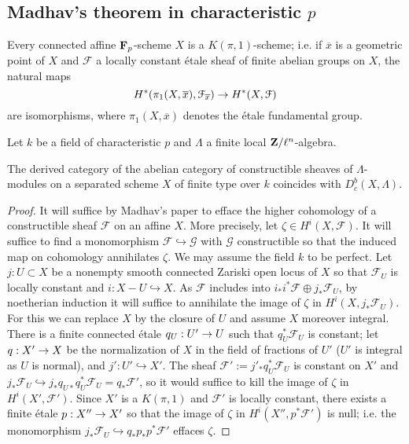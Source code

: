 \documentclass[deligne.tex]{subfiles}
\begin{document}
\newpage
\subsection*{Madhav's theorem in characteristic $p$}
\begin{theorem*}[Achinger]
	Every connected affine $\mathbf{F}_p$-scheme $X$ is a $K(\pi,1)$-scheme; i.e.
	if $\overline x$ is a geometric point of $X$ and $\mathcal F$ a locally
	constant étale sheaf of finite abelian groups on $X$, the natural maps
	\begin{equation*}
	H^*(\pi_1(X,\overline x),\mathcal F_{\overline x})\rightarrow H^*(X,\mathcal F)
	\end{equation*}
	are isomorphisms, where $\pi_1(X,\overline x)$ denotes the étale 
	fundamental group.
\end{theorem*}
Let $k$ be a field of characteristic $p$ and $\Lambda$ a finite local
$\mathbf{Z}/\ell^n$-algebra.
\begin{corollary*}
	The derived category of the abelian category of constructible sheaves of
	$\Lambda$-modules on a separated scheme $X$ of finite type over $k$
	coincides with $D_c^b(X,\Lambda)$.
\end{corollary*}
\begin{proof}
	It will suffice by Madhav's paper to efface the higher cohomology of a 
constructible sheaf $\mathcal F$ on an affine $X$.
More precisely, let $\zeta\in H^i(X,\mathcal F)$.
It will suffice to find a monomorphism $\mathcal F\hookrightarrow\mathcal G$
with $\mathcal G$ constructible so that the induced map on cohomology
annihilates $\zeta$. We may assume the field $k$ to be perfect.
Let $j:U\subset X$ be a nonempty smooth connected Zariski open locus
of $X$ so that $\mathcal F_U$ is locally constant and
$i:X-U\hookrightarrow X$.
As $\mathcal F$ includes into $i_*i^*\mathcal F\oplus j_*\mathcal F_U$, by
noetherian induction it will suffice to annihilate the image of $\zeta$ in
$H^i(X,j_*\mathcal F_U)$. For this we can replace $X$ by the closure of $U$
and assume $X$ moreover integral.
There is a finite connected étale $q_U:U'\rightarrow U$ such that
$q_U^*\mathcal F_U$ is constant; let $q:X'\rightarrow X$ be the normalization of $X$
in the field of fractions of $U'$ ($U'$ is integral as $U$ is normal),
and $j':U'\hookrightarrow X'$.
The sheaf $\mathcal F':=j'_*q_U^*\mathcal F_U$ is constant on $X'$ and
$j_*\mathcal F_U\hookrightarrow j_*q_{U*}q_U^*\mathcal F_U=q_*\mathcal F'$,
so it would  suffice to kill the image of $\zeta$ in $H^i(X',\mathcal F')$.
Since $X'$ is a $K(\pi,1)$ and $\mathcal F'$ is locally constant,
there exists a finite étale $p:X''\rightarrow X'$ so that the image of 
$\zeta$ in $H^i(X'',p^*\mathcal F')$ is null; i.e. the monomorphism
$j_*\mathcal F_U\hookrightarrow q_*p_*p^*\mathcal F'$ effaces $\zeta$.
\end{proof}
\end{document}
